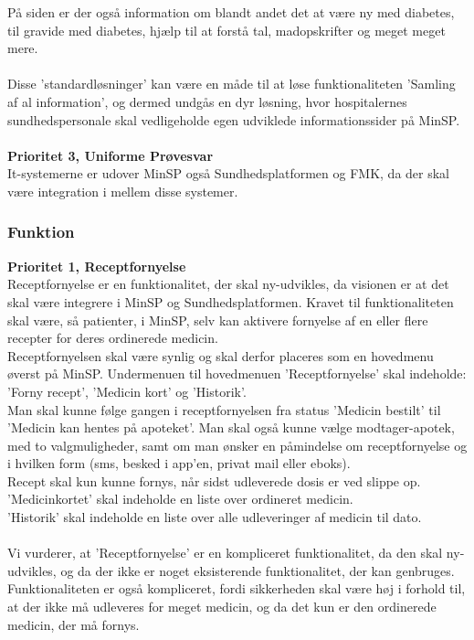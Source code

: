 På siden er der også information om blandt andet det at være ny med diabetes, til gravide med diabetes, hjælp til at forstå tal, madopskrifter og meget meget mere. 
\\ \\
Disse 'standardløsninger' kan være en måde til at løse funktionaliteten 'Samling af al information', og dermed undgås en dyr løsning, hvor hospitalernes sundhedspersonale skal vedligeholde egen udviklede informationssider på MinSP.
\\\\
\textbf{Prioritet 3, Uniforme Prøvesvar} \\
It-systemerne er udover MinSP også Sundhedsplatformen og FMK, da der skal være integration i mellem disse systemer.
\subsubsection{Funktion}  
\textbf{Prioritet 1, Receptfornyelse}\\
Receptfornyelse er en funktionalitet, der skal ny-udvikles, da visionen er at det skal være integrere i MinSP og Sundhedsplatformen. Kravet til funktionaliteten skal være, så patienter, i MinSP, selv kan aktivere fornyelse af en eller flere recepter for deres ordinerede medicin. 
\\
Receptfornyelsen skal være synlig og skal derfor placeres som en hovedmenu øverst på MinSP. Undermenuen til hovedmenuen 'Receptfornyelse' skal indeholde: 'Forny recept', 'Medicin kort' og 'Historik'.
\\
Man skal kunne følge gangen i receptfornyelsen fra status 'Medicin bestilt' til 'Medicin kan hentes på apoteket'. Man skal også kunne vælge modtager-apotek, med to valgmuligheder, samt om man ønsker en påmindelse om receptfornyelse og i hvilken form (sms, besked i app'en, privat mail eller eboks). 
\\ 
Recept skal kun kunne fornys, når sidst udleverede dosis er ved slippe op.  
\\
'Medicinkortet' skal indeholde en liste over ordineret medicin.\\ 
'Historik' skal indeholde en liste over alle udleveringer af medicin til dato.
\\ \\
Vi vurderer, at 'Receptfornyelse' er en kompliceret funktionalitet, da den skal ny-udvikles, og da der ikke er noget eksisterende funktionalitet, der kan genbruges. Funktionaliteten er også kompliceret, fordi sikkerheden skal være høj i forhold til, at der ikke må udleveres for meget medicin, og da det kun er den ordinerede medicin, der må fornys. \\
